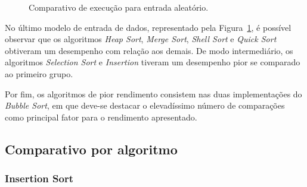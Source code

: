 \documentclass[conference]{IEEEtran}
\begin{document}
\begin{figure}

\centering
{}

\caption{Comparativo de execução para entrada aleatório.}
\label{image: aleatoria}
\end{figure}

No último modelo de entrada de dados, representado pela Figura~\ref{image: aleatoria}, é possível observar que os algoritmos \textit{Heap Sort}, \textit{Merge Sort}, \textit{Shell Sort} e \textit{Quick Sort} obtiveram um desempenho com relação aos demais. De modo intermediário, os algoritmos \textit{Selection Sort} e \textit{Insertion} tiveram um desempenho pior se comparado ao primeiro grupo. 

Por fim, os algoritmos de pior rendimento consistem nas duas implementações do \textit{Bubble Sort}, em que deve-se destacar o elevadíssimo número de comparações como principal fator para o rendimento apresentado.


\subsection{Comparativo por algoritmo}

\subsubsection{Insertion Sort}
\end{document}
